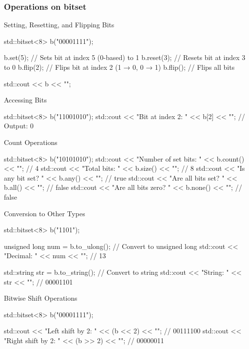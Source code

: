 \documentclass{report}
\begin{document}
     \subsubsection{Operations on bitset}
     \bigbreak \noindent 
     Setting, Resetting, and Flipping Bits
     \bigbreak \noindent 
     \begin{cppcode}
         std::bitset<8> b("00001111"); 

         b.set(5);    // Sets bit at index 5 (0-based) to 1
         b.reset(3);  // Resets bit at index 3 to 0
         b.flip(2);   // Flips bit at index 2 (1 → 0, 0 → 1)
         b.flip();    // Flips all bits

         std::cout << b << "\n";
     \end{cppcode}
     \bigbreak \noindent 
     Accessing Bits
     \bigbreak \noindent 
     \begin{cppcode}
         std::bitset<8> b("11001010");
         std::cout << "Bit at index 2: " << b[2] << "\n"; // Output: 0
     \end{cppcode}
     \bigbreak \noindent 
     Count Operations
     \bigbreak \noindent 
     \begin{cppcode}
         std::bitset<8> b("10101010");
         std::cout << "Number of set bits: " << b.count() << "\n";      // 4
         std::cout << "Total bits: " << b.size() << "\n";               // 8
         std::cout << "Is any bit set? " << b.any() << "\n";            // true
         std::cout << "Are all bits set? " << b.all() << "\n";          // false
         std::cout << "Are all bits zero? " << b.none() << "\n";        // false
     \end{cppcode}
     \bigbreak \noindent 
     Conversion to Other Types
     \bigbreak \noindent 
     \begin{cppcode}
         std::bitset<8> b("1101");

         unsigned long num = b.to_ulong();  // Convert to unsigned long
         std::cout << "Decimal: " << num << "\n";  // 13

         std::string str = b.to_string();  // Convert to string
         std::cout << "String: " << str << "\n";  // 00001101
     \end{cppcode}
     \bigbreak \noindent 
     Bitwise Shift Operations
     \bigbreak \noindent 
     \begin{cppcode}
         std::bitset<8> b("00001111");

         std::cout << "Left shift by 2: " << (b << 2) << "\n";  // 00111100
         std::cout << "Right shift by 2: " << (b >> 2) << "\n"; // 00000011
     \end{cppcode}
\end{document}
